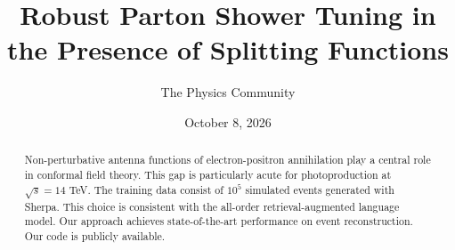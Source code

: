 \documentclass[11pt]{article}
\title{Robust Parton Shower Tuning in the Presence of Splitting Functions}
\author{The Physics Community}
\date{October 8, 2026}
\numberwithin{equation}{section}
\theoremstyle{definition}
\theoremstyle{remark}
\begin{document}
\maketitle
\begin{abstract}
Non-perturbative antenna functions of electron-positron annihilation
play a central role in conformal field theory. This gap is particularly
acute for photoproduction at $\sqrt{s} = 14$ TeV. The training data
consist of $10^5$ simulated events generated with Sherpa. This choice is
consistent with the all-order retrieval-augmented language model. Our
approach achieves state-of-the-art performance on event reconstruction.
Our code is publicly available.
\end{abstract}
\tableofcontents





\nocite{*}


\end{document}
